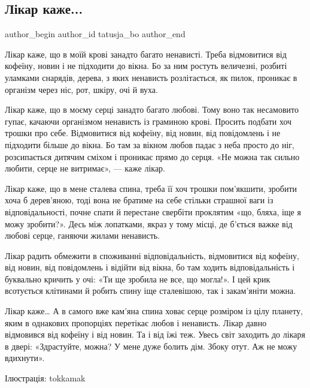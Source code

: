  
 
 
 
 

\subsection{Лікар каже...}
\label{sec:02_12_2022.fb.tatusja_bo.1.l_kar_kazhe_}

\ifcmt
 author_begin
   author_id tatusja_bo
 author_end
\fi

Лікар каже, що в моїй крові занадто багато ненависті. Треба відмовитися від
кофеїну, новин і не підходити до вікна. Бо за ним ростуть величезні, розбиті
уламками снарядів, дерева, з яких ненависть розлітається, як пилок, проникає в
організм через ніс, рот, шкіру, очі й вуха.

Лікар каже, що в моєму серці занадто багато любові. Тому воно так несамовито
гупає, качаючи організмом ненависть із граминою крові. Просить подбати хоч
трошки про себе. Відмовитися від кофеїну, від новин, від повідомлень і не
підходити більше до вікна. Бо там за вікном любов падає з неба просто до ніг,
розсипається дитячим сміхом і проникає прямо до серця. «Не можна так сильно
любити, серце не витримає», — каже лікар.

Лікар каже, що в мене сталева спина, треба її хоч трошки пом'якшити, зробити
хоча б дерев'яною, тоді вона не братиме на себе стільки страшної ваги із
відповідальності, почне спати й перестане свербіти проклятим «що, бляха, іще я
можу зробити?». Десь між лопатками, якраз у тому місці, де б'ється важке від
любові серце, ганяючи жилами ненависть.

Лікар радить обмежити в споживанні відповідальність, відмовитися від кофеїну,
від новин, від повідомлень і відійти від вікна, бо там ходить відповідальність
і буквально кричить у очі: «Ти ще зробила не все, що могла!». І цей крик
всотується клітинами й робить спину іще сталевішою, так і закам'яніти можна.

Лікар каже… А в самого вже кам'яна спина ховає серце розміром із цілу планету,
яким в однакових пропорціях перетікає любов і ненависть. Лікар давно відмовився
від кофеїну і від новин. Та і від їжі теж. Увесь світ заходить до лікаря в
двері: «Здрастуйте, можна? У мене дуже болить дім. Збоку отут. Аж не можу
вдихнути».

Ілюстрація: tokkamak
